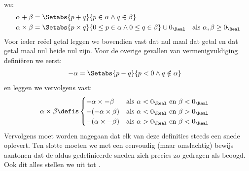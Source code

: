 \documentclass[openany]{memoir}
\begin{document}
we:
\begin{align*}
	\alpha + \beta &= \Setabs{p + q}{p \in \alpha \land q \in \beta}\\
	\alpha \times \beta &=
	\Setabs{p \times q}{0 \leq p \in \alpha \land 0 \leq q \in \beta} \cup 0_\Real & \text{als }\alpha, \beta \geq 0_\Real
\end{align*}
Voor ieder reëel getal leggen we bovendien vast dat nul maal dat getal
en dat getal maal nul beide nul zijn. Voor de overige gevallen van
vermenigvuldiging definiëren we eerst:
\begin{align*}
	-\alpha &= \Setabs{p - q}{p < 0 \land q \notin \alpha}
\end{align*}
en leggen we vervolgens vast:
\begin{align*}
	\alpha \times \beta &\defis
	\begin{cases}
		\mathord{-}\alpha \times \mathord{-}\beta &\text{als }\alpha < 0_\Real\text{ en }\beta < 0_\Real\\
		\mathord{-}(\mathord{-}\alpha \times \beta) &\text{als }\alpha < 0_\Real \text{ en }\beta > 0_\Real\\
		\mathord{-}(\alpha \times \mathord{-}\beta) &\text{als }\alpha > 0_\Real \text{ en }\beta < 0_\Real
	\end{cases}
\end{align*}
Vervolgens moet worden nagegaan dat elk van deze definities steeds een
snede oplevert. Ten slotte moeten we met een eenvoudig (maar omslachtig)
bewijs aantonen dat de aldus gedefinieerde sneden zich precies zo
gedragen als beoogd. Ook dit alles stellen we uit tot
.
\endgroup

\begingroup
\def\olfilename{OLP-0046}
\def\olfilepath{content/sets-functions-relations/arithmetization/}
\hypertarget{unit-OLP-0046}{}
\end{document}

